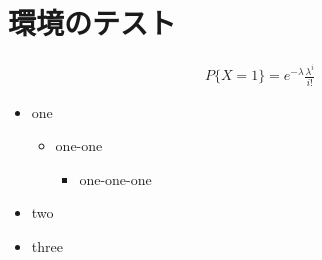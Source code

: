 \documentclass{word-lua}
\begin{document}
% 

\section{環境のテスト}

\begin{eqnarray*}
	P\{X = 1\} = e^{-\lambda}\frac{\lambda^i}{i!}
\end{eqnarray*}

\begin{itemize}
	\item one
		\begin{itemize}
			\item one-one

				\begin{itemize}
					\item one-one-one
				\end{itemize}
		\end{itemize}

	\item two

	\item three
\end{itemize}
\end{document}
